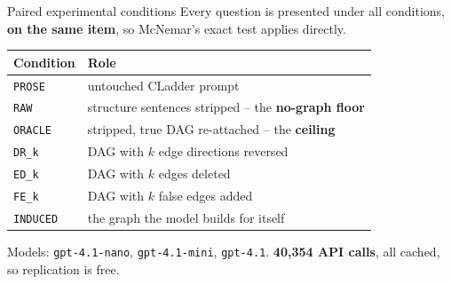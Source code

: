 \documentclass{beamer}
\begin{document}
\begin{frame}{Paired experimental conditions}
  Every question is presented under all conditions, \textbf{on the same item},
  so McNemar's exact test applies directly.

  \begin{center}
  \small
  \begin{tabular}{ll}
    \toprule
    Condition & Role \\
    \midrule
    \texttt{PROSE}  & untouched CLadder prompt \\
    \texttt{RAW}    & structure sentences stripped -- the \textbf{no-graph floor} \\
    \texttt{ORACLE} & stripped, true DAG re-attached -- the \textbf{ceiling} \\
    \texttt{DR\_k}  & DAG with $k$ edge directions reversed \\
    \texttt{ED\_k}  & DAG with $k$ edges deleted \\
    \texttt{FE\_k}  & DAG with $k$ false edges added \\
    \texttt{INDUCED}& the graph the model builds for itself \\
    \bottomrule
  \end{tabular}
  \end{center}

  \vspace{0.3cm}
  Models: \texttt{gpt-4.1-nano}, \texttt{gpt-4.1-mini}, \texttt{gpt-4.1}.
  \textbf{40{,}354 API calls}, all cached, so replication is free.
\end{frame}
\end{document}
